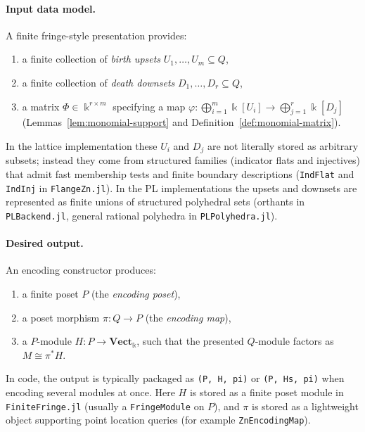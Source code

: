 \documentclass{article}
\newcommand{\kk}{\Bbbk}
\newcommand{\<}{\langle}
\renewcommand{\>}{\rangle}
\theoremstyle{definition}
\theoremstyle{remark}
\begin{document}
	\paragraph{Input data model.}
	A finite fringe-style presentation provides:
	\begin{enumerate}[label=(\roman*)]
		\item a finite collection of \emph{birth upsets} $U_1,\dots,U_m\subseteq Q$,
		\item a finite collection of \emph{death downsets} $D_1,\dots,D_r\subseteq Q$,
		\item a matrix $\Phi\in \kk^{r\times m}$ specifying a map
		$\varphi\colon \bigoplus_{i=1}^m \kk[U_i]\to \bigoplus_{j=1}^r \kk[D_j]$
		(Lemmas~\ref{lem:monomial-support} and Definition~\ref{def:monomial-matrix}).
	\end{enumerate}
	In the lattice implementation these $U_i$ and $D_j$ are not literally stored as
	arbitrary subsets; instead they come from structured families (indicator flats and
	injectives) that admit fast membership tests and finite boundary descriptions
	(\texttt{IndFlat} and \texttt{IndInj} in \texttt{FlangeZn.jl}).  In the PL
	implementations the upsets and downsets are represented as finite unions of
	structured polyhedral sets (orthants in \texttt{PLBackend.jl}, general rational
	polyhedra in \texttt{PLPolyhedra.jl}).
	
	\paragraph{Desired output.}
	An encoding constructor produces:
	\begin{enumerate}[label=(\roman*)]
		\item a finite poset $P$ (the \emph{encoding poset}),
		\item a poset morphism $\pi\colon Q\to P$ (the \emph{encoding map}),
		\item a $P$-module $H\colon P\to \mathbf{Vect}_{\kk}$, such that the presented
		$Q$-module factors as $M\cong \pi^*H$.
	\end{enumerate}
	In code, the output is typically packaged as \texttt{(P, H, pi)} or
	\texttt{(P, Hs, pi)} when encoding several modules at once.
	Here $H$ is stored as a finite poset module in \texttt{FiniteFringe.jl} (usually a
	\texttt{FringeModule} on $P$), and $\pi$ is stored as a lightweight object
	supporting point location queries (for example \texttt{ZnEncodingMap}).
	
\end{document}
